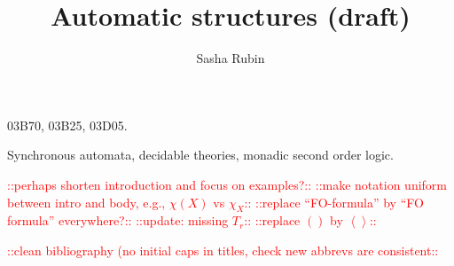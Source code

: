 \documentclass{irmaart}
\newcommand\dateandtime{\today}
\newcommand{\2}{\{0,1\}^\star}
\newcommand\todo[1]{\textcolor{red}{::#1::}}
\begin{document}
\title{Automatic structures (draft)}
\author{Sasha Rubin}
\address{email:\,\url{rubin@unina.it}\\[4mm]
\upshape{\dateandtime}}

\maketitle\label{chapterAS} 

\begin{classification}
03B70, 03B25, 03D05.
\end{classification}

\begin{keywords}
  Synchronous automata, decidable theories, monadic second order logic.
\end{keywords}


\todo{perhaps shorten introduction and focus on examples?}
\todo{make notation uniform between intro and body, e.g., $\chi(X)$ vs $\chi_X$}
\todo{replace ``FO-formula'' by ``FO formula'' everywhere?}
\todo{update: missing $T_r$}
\todo{replace $()$ by $\left< \right>$}


\localtableofcontents


\todo{clean bibliography (no initial caps in titles, check new abbrevs are consistent}


\begin{footnotesize}
  
\end{footnotesize}


\printindex
\end{document}
